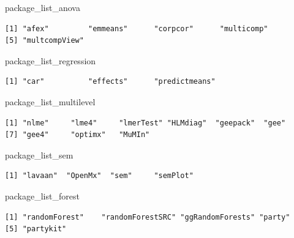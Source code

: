 \documentclass[]{book}
\newenvironment{Shaded}{\begin{snugshade}}{\end{snugshade}}
\newcommand{\NormalTok}[1]{#1}
\theoremstyle{definition}
\theoremstyle{definition}
\theoremstyle{definition}
\theoremstyle{remark}
\begin{document}
\begin{Shaded}
\begin{Highlighting}[]
\NormalTok{package_list_anova}
\end{Highlighting}
\end{Shaded}

\begin{verbatim}
[1] "afex"         "emmeans"      "corpcor"      "multicomp"   
[5] "multcompView"
\end{verbatim}

\begin{Shaded}
\begin{Highlighting}[]
\NormalTok{package_list_regression}
\end{Highlighting}
\end{Shaded}

\begin{verbatim}
[1] "car"          "effects"      "predictmeans"
\end{verbatim}

\begin{Shaded}
\begin{Highlighting}[]
\NormalTok{package_list_multilevel}
\end{Highlighting}
\end{Shaded}

\begin{verbatim}
[1] "nlme"     "lme4"     "lmerTest" "HLMdiag"  "geepack"  "gee"     
[7] "gee4"     "optimx"   "MuMIn"   
\end{verbatim}

\begin{Shaded}
\begin{Highlighting}[]
\NormalTok{package_list_sem}
\end{Highlighting}
\end{Shaded}

\begin{verbatim}
[1] "lavaan"  "OpenMx"  "sem"     "semPlot"
\end{verbatim}

\begin{Shaded}
\begin{Highlighting}[]
\NormalTok{package_list_forest}
\end{Highlighting}
\end{Shaded}

\begin{verbatim}
[1] "randomForest"    "randomForestSRC" "ggRandomForests" "party"          
[5] "partykit"       
\end{verbatim}
\end{document}
